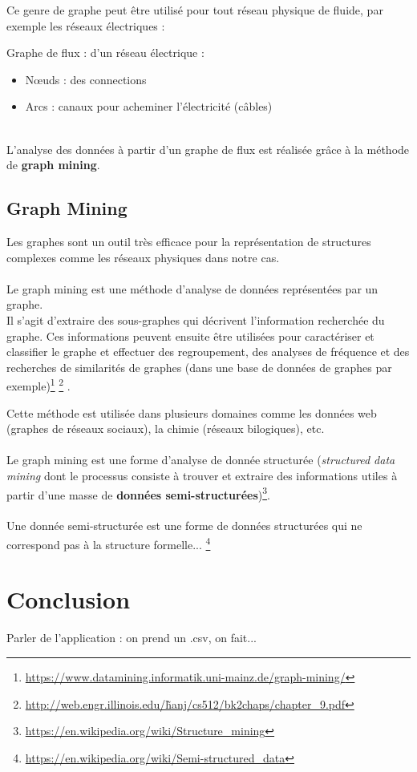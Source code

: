 	\begin{frame}
		Ce genre de graphe peut être utilisé pour tout réseau physique de fluide, par exemple les réseaux électriques :
		\pause
		\begin{exampleblock}{Graphe de flux : d'un réseau électrique :}
		\begin{itemize}
		\item Nœuds : des connections
		\item Arcs : canaux pour acheminer l'électricité (câbles)
		\end{itemize}
		\end{exampleblock}
		~\\
		\pause
		L'analyse des données à partir d'un graphe de flux est réalisée grâce à la méthode de \textbf{graph mining}.
	\end{frame}	
	
	\subsection{Graph Mining}
	\begin{frame}
		Les graphes sont un outil très efficace pour la représentation de structures complexes comme les réseaux physiques dans notre cas.\\~\\
		\pause
		Le graph mining est une méthode d'analyse de données représentées par un graphe.\\ 
		\pause
		Il s'agit d'extraire des sous-graphes qui décrivent l'information recherchée du graphe. Ces informations peuvent ensuite être utilisées pour caractériser et classifier le graphe et effectuer des regroupement, des analyses de fréquence et des recherches de similarités de graphes (dans une base de données de graphes par exemple)\footnote{\href{https://www.datamining.informatik.uni-mainz.de/graph-mining/}{https://www.datamining.informatik.uni-mainz.de/graph-mining/}}
		\footnote{\href{http://web.engr.illinois.edu/\~hanj/cs512/bk2chaps/chapter\_9.pdf}{http://web.engr.illinois.edu/\~hanj/cs512/bk2chaps/chapter\_9.pdf}}
		.
	\end{frame}
	\begin{frame}
		Cette méthode est utilisée dans plusieurs domaines comme les données web (graphes de réseaux sociaux), la chimie (réseaux bilogiques), etc.
		\\~\\
		\pause
		Le graph mining est une forme d'analyse de donnée structurée (\textit{structured data mining} dont le processus consiste à trouver et extraire des informations utiles à partir d'une masse de \textbf{données semi-structurées})\footnote{\href{https://en.wikipedia.org/wiki/Structure\_mining}{https://en.wikipedia.org/wiki/Structure\_mining}}.\\~\\
		\pause
		Une donnée semi-structurée est une forme de données structurées qui ne correspond pas à la structure formelle... \footnote{\href{https://en.wikipedia.org/wiki/Semi-structured\_data}{https://en.wikipedia.org/wiki/Semi-structured\_data}}
	\end{frame}
	
	\section{Conclusion}
	\begin{frame}
		Parler de l'application : on prend un .csv, on fait...
	\end{frame}

